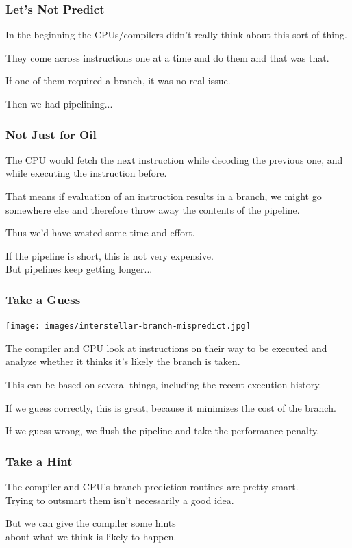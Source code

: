 \begin{frame}
\frametitle{Let's Not Predict}

In the beginning the CPUs/compilers didn't really think about this sort of thing.

They come across instructions one at a time and do them and that was that. 

If one of them required a branch, it was no real issue. 

Then we had pipelining...
\end{frame}



\begin{frame}
\frametitle{Not Just for Oil}

The CPU would fetch the next instruction while decoding the previous one, and while executing the instruction before. 

That means if evaluation of an instruction results in a branch, we might go somewhere else and therefore throw away the contents of the pipeline. 

Thus we'd have wasted some time and effort. 

If the pipeline is short, this is not very expensive.\\
\quad But pipelines keep getting longer... 

\end{frame}



\begin{frame}
\frametitle{Take a Guess}

\begin{center}
	\texttt{[image: images/interstellar-branch-mispredict.jpg]}
\end{center}

The compiler and CPU look at instructions on their way to be executed and analyze whether it thinks it's likely the branch is taken. 

This can be based on several things, including the recent execution history. 

If we guess correctly, this is great, because it minimizes the cost of the branch. 

If we guess wrong, we flush the pipeline and take the performance penalty.

\end{frame}



\begin{frame}
\frametitle{Take a Hint}

The compiler and CPU's branch prediction routines are pretty smart.\\
\quad Trying to outsmart them isn't necessarily a good idea. 

But we can give the compiler some hints\\
\qquad about what we think is likely to happen. 

\end{frame}


